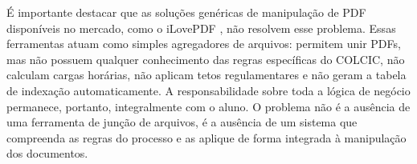 É importante destacar que as soluções genéricas de manipulação de PDF disponíveis no mercado, como o iLovePDF \cite{}, não resolvem esse problema. Essas ferramentas atuam como simples agregadores de arquivos: permitem unir PDFs, mas não possuem qualquer conhecimento das regras específicas do COLCIC, não calculam cargas horárias, não aplicam tetos regulamentares e não geram a tabela de indexação automaticamente. A responsabilidade sobre toda a lógica de negócio permanece, portanto, integralmente com o aluno. O problema não é a ausência de uma ferramenta de junção de arquivos, é a ausência de um sistema que compreenda as regras do processo e as aplique de forma integrada à manipulação dos documentos.


